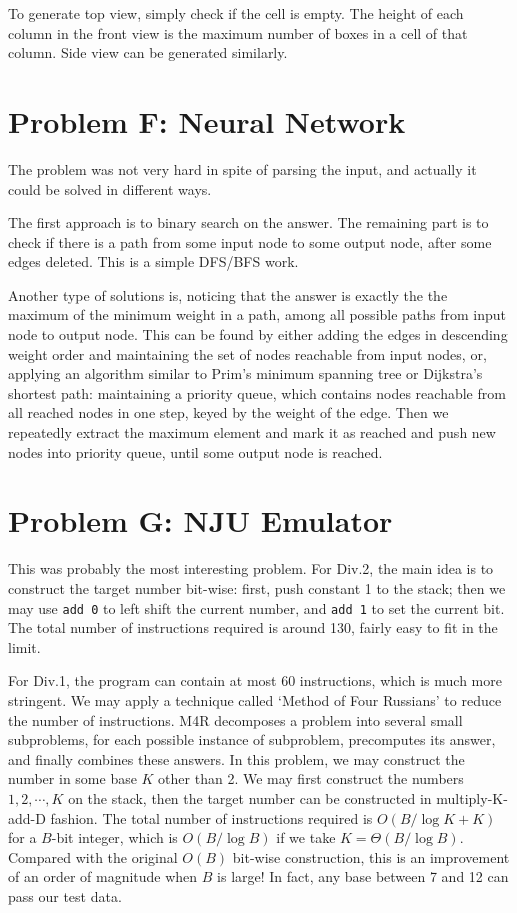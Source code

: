 \documentclass[a4paper,10.5pt,twoside]{article}
\begin{document}
To generate top view, simply check if the cell is empty. The height of each column in the front view is the maximum number of boxes in a cell of that column. Side view can be generated similarly.

\section*{Problem F: Neural Network}

The problem was not very hard in spite of parsing the input, and actually it could be solved in different ways.

The first approach is to binary search on the answer. The remaining part is to check if there is a path from some input node to some output node, after some edges deleted. This is a simple DFS/BFS work.

Another type of solutions is, noticing that the answer is exactly the the maximum of the minimum weight in a path, among all possible paths from input node to output node. This can be found by either adding the edges in descending weight order and maintaining the set of nodes reachable from input nodes, or, applying an algorithm similar to Prim's minimum spanning tree or Dijkstra's shortest path: maintaining a priority queue, which contains nodes reachable from all reached nodes in one step, keyed by the weight of the edge. Then we repeatedly extract the maximum element and mark it as reached and push new nodes into priority queue, until some output node is reached.

\section*{Problem G: NJU Emulator}

This was probably the most interesting problem. For Div.2, the main idea is to construct the target number bit-wise: first, push constant 1 to the stack; then we may use \texttt{add 0} to left shift the current number, and \texttt{add 1} to set the current bit. The total number of instructions required is around 130, fairly easy to fit in the limit.

For Div.1, the program can contain at most 60 instructions, which is much more stringent. We may apply a technique called `Method of Four Russians' to reduce the number of instructions. M4R decomposes a problem into several small subproblems,  for each possible instance of subproblem, precomputes its answer, and finally combines these answers. In this problem, we may construct the number in some base $K$ other than 2. We may first construct the numbers $1, 2, \cdots, K$ on the stack, then the target number can be constructed in multiply-K-add-D fashion. The total number of instructions required is $O(B / \log K + K)$ for a $B$-bit integer, which is $O(B / \log B)$ if we take $K = \Theta(B / \log B)$. Compared with the original $O(B)$ bit-wise construction, this is an improvement of an order of magnitude when $B$ is large! In fact, any base between 7 and 12 can pass our test data.
\end{document}
